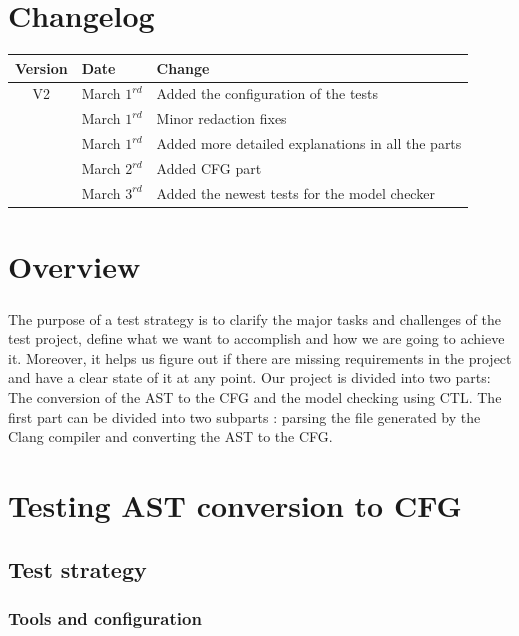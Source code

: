 \documentclass{report}
\begin{document}
\chapter* {Changelog}
\begin{center}
\begin{tabular}{|c|l|l|}
  \hline
  Version & Date & Change  \\
  \hline
  V2 & March $1^{rd}$  & Added the configuration of the tests \\
  & March $1^{rd}$  & Minor redaction fixes \\
  & March $1^{rd}$  & Added more detailed explanations in all the parts \\
  & March $2^{rd}$  & Added CFG part \\
& March $3^{rd}$  & Added the newest tests for the model checker \\
  \hline
\end{tabular}
\end{center}
\chapter* {Overview}
\paragraph{}
\hspace{4mm}\textnormal{The purpose of a test strategy is to clarify the major tasks and challenges of the test project, define what we want to accomplish and how we are going to achieve it. 
Moreover, it helps us figure out if there are missing requirements in the project and have a clear state of it at any point.
Our project is divided into two parts: The conversion of the AST to the CFG and the model checking using CTL.
The first part can be divided into two subparts : parsing the file generated by the Clang compiler and converting the AST to the CFG.}

\chapter{Testing AST conversion to CFG}

\section{Test strategy}

\subsection{Tools and configuration}
\end{document}
